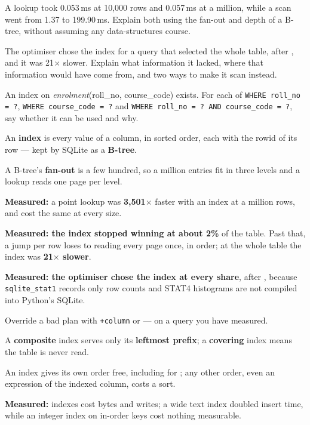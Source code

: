\begin{checkpoint}
\begin{tightnum}
  \item A lookup took 0.053\,ms at 10{,}000 rows and 0.057\,ms at a million,
        while a scan went from 1.37 to 199.90\,ms. Explain both using the
        fan-out and depth of a B-tree, without assuming any data-structures
        course.
  \item The optimiser chose the index for a query that selected the whole
        table, after , and it was 21$\times$ slower. Explain
        what information it lacked, where that information would have come
        from, and two ways to make it scan instead.
  \item An index on \textit{enrolment}(roll\_no, course\_code) exists. For each
        of \texttt{WHERE roll\_no = ?}, \texttt{WHERE course\_code = ?} and
        \texttt{WHERE roll\_no = ? AND course\_code = ?}, say whether it can be
        used and why.
\end{tightnum}
\end{checkpoint}

\begin{chaptersummary}
\begin{tight}
  \item An \textbf{index} is every value of a column, in sorted order, each
        with the rowid of its row --- kept by SQLite as a \textbf{B-tree}.
  \item A B-tree's \textbf{fan-out} is a few hundred, so a million entries fit
        in three levels and a lookup reads one page per level.
  \item \textbf{Measured:} a point lookup was \textbf{3{,}501$\times$} faster
        with an index at a million rows, and cost the same at every size.
  \item \textbf{Measured: the index stopped winning at about 2\%} of the table.
        Past that, a jump per row loses to reading every page once, in order;
        at the whole table the index was \textbf{21$\times$ slower}.
  \item \textbf{Measured: the optimiser chose the index at every share}, after
        , because \texttt{sqlite\_stat1} records only row counts
        and STAT4 histograms are not compiled into Python's SQLite.
  \item Override a bad plan with \texttt{+column} or  ---
        on a query you have measured.
  \item A \textbf{composite} index serves only its \textbf{leftmost prefix}; a
        \textbf{covering} index means the table is never read.
  \item An index gives its own order free, including for ; any
        other order, even an expression of the indexed column, costs a sort.
  \item \textbf{Measured:} indexes cost bytes and writes; a wide text index
        doubled insert time, while an integer index on in-order keys cost
        nothing measurable.
\end{tight}
\end{chaptersummary}

